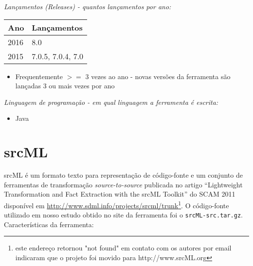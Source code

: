 \begin{description}

  \item {\it Lançamentos ({\it Releases}) - quantos lançamentos por ano:}
    \begin{table}[h!]
      \centering
      \begin{tabular}{| l | l |}
        \hline
        Ano  & Lançamentos       \\
        \hline
        2016 & 8.0               \\
        2015 & 7.0.5, 7.0.4, 7.0 \\
        \hline
      \end{tabular}
    \end{table}
    \begin{itemize}
      \item Frequentemente $>=$ 3 vezes ao ano - novas versões da ferramenta são lançadas 3 ou mais vezes por ano
    \end{itemize}

  \item {\it Linguagem de programação - em qual linguagem a ferramenta é escrita:}
    \begin{itemize}
      \item Java
    \end{itemize}

\end{description}

\section{srcML}

srcML é um formato texto para representação de código-fonte e um conjunto de
ferramentas de transformação {\it source-to-source} publicada no artigo
``Lightweight Transformation and Fact Extraction with the srcML Toolkit'' do
SCAM 2011 disponível em
\url{http://www.sdml.info/projects/srcml/trunk}\footnote{este endereço
retornou "not found" em contato com os autores por email indicaram que o
projeto foi movido para http://www.srcML.org}. O código-fonte utilizado em
nosso estudo obtido no site da ferramenta foi o \texttt{srcML-src.tar.gz}.
Características da ferramenta:

